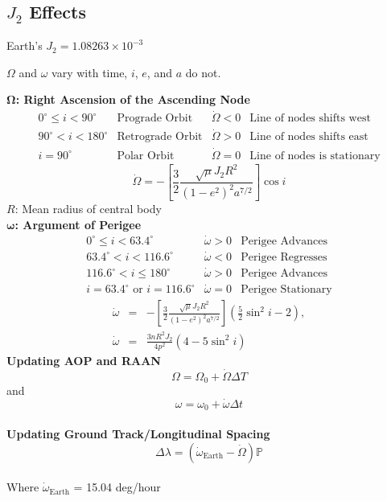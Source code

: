 \documentclass{article}
\begin{document}
\begin{multicols*}{3}
    \subsection*{$J_2$ Effects}
    Earth's $J_2 = 1.08263\times 10^{-3}$\par 
    $\Omega$ and $\omega$ vary with time, $i$, $e$, and $a$ do not.\par 
    $\mathbf{\Omega}$\textbf{: Right Ascension of the Ascending Node} 
    \begin{equation*}
        \begin{array}{llll}
            0^\circ \le i < 90^\circ & \text{Prograde Orbit} & \dot{\Omega}<0 & \text{Line of nodes shifts west} \\
            90^\circ < i < 180^\circ & \text{Retrograde Orbit} & \dot{\Omega}>0 & \text{Line of nodes shifts east}\\
            i=90^\circ & \text{Polar Orbit} & \dot{\Omega}=0 & \text{Line of nodes is stationary}
        \end{array}
    \end{equation*}
    $$\dot{\Omega}=-\left[\frac{3}{2} \frac{\sqrt{\mu}J_2R^2}{(1-e^2)^2a^{7/2}} \right]\cos{i}$$
    $R$: Mean radius of central body\\
    $\mathbf{\omega}$\textbf{: Argument of Perigee}
    \begin{equation*}
        \begin{array}{lll}
            0^\circ \le i < 63.4^\circ & \dot{\omega}>0 & \text{Perigee Advances}\\
            63.4^\circ < i < 116.6^\circ & \dot{\omega}<0 & \text{Perigee Regresses}\\
            116.6^\circ < i \le 180^\circ & \dot{\omega}>0 & \text{Perigee Advances}\\
            i=63.4^\circ \text{ or } i=116.6^\circ & \dot{\omega}=0 & \text{Perigee Stationary}
        \end{array}
    \end{equation*}
    \begin{equation*}
        \begin{array}{lll}
            \dot{\omega}&=&-\left[\frac{3}{2} \frac{\sqrt{\mu}J_2R^2}{(1-e^2)^2a^{7/2}} \right]\left(\frac{5}{2}\sin^2{i}-2\right), \\
            \dot{\omega}&=&\frac{3nR^2J_2}{4p^2}(4-5\sin^2{i})
        \end{array}
    \end{equation*}
    \textbf{Updating AOP and RAAN}\\
    $$\Omega = \Omega_0 + \dot{\Omega}\Delta T$$ and $$\omega = \omega_0+\dot{\omega}\Delta t$$\\
    \textbf{Updating Ground Track/Longitudinal Spacing}\\
    $$\Delta\lambda = (\dot{\omega}_{\text{Earth}}-\dot{\Omega})\mathbb{P}$$\\
    Where $\dot{\omega}_{\text{Earth}}$ = 15.04 deg/hour


\end{multicols*}
\end{document}
